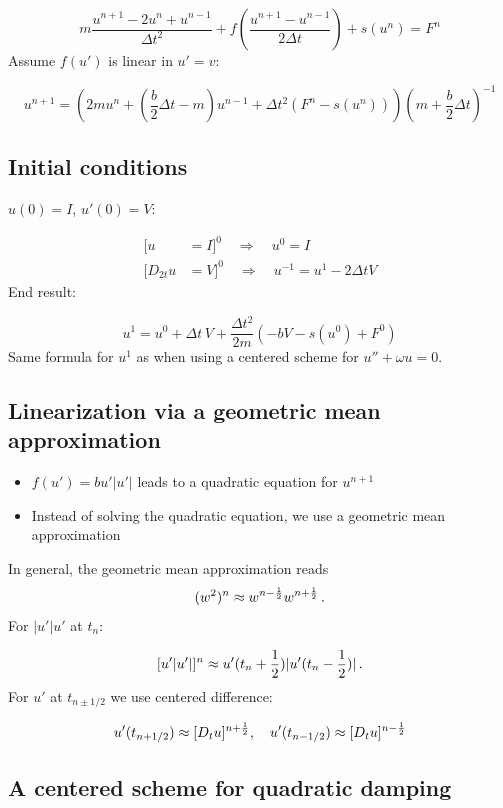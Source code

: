 \documentclass[%
oneside,                 %
final,                   %
10pt]{article}
\begin{document}
\[
m\frac{u^{n+1}-2u^n + u^{n-1}}{\Delta t^2}
+ f(\frac{u^{n+1}-u^{n-1}}{2\Delta t}) + s(u^n) = F^n
\]
Assume $f(u')$ is linear in $u'=v$:

\[
u^{n+1} = \left(2mu^n + (\frac{b}{2}\Delta t - m)u^{n-1} +
\Delta t^2(F^n - s(u^n))
\right)(m + \frac{b}{2}\Delta t)^{-1}
\]

\subsection*{Initial conditions}

$u(0)=I$, $u'(0)=V$:

\begin{align*}
\lbrack u &=I\rbrack^0\quad\Rightarrow\quad u^0=I\\ 
\lbrack D_{2t}u &=V\rbrack^0\quad\Rightarrow\quad u^{-1} = u^{1} - 2\Delta t V
\end{align*}
End result:

\[
u^1 = u^0 + \Delta t\, V
+ \frac{\Delta t^2}{2m}(-bV - s(u^0) + F^0)
\]
Same formula for $u^1$ as when using a centered scheme for $u''+\omega u=0$.

\subsection*{Linearization via a geometric mean approximation}
\label{vib:ode2:fdm:fquad}

\begin{itemize}
 \item $f(u')=bu'|u'|$ leads to a quadratic equation for $u^{n+1}$

 \item Instead of solving the quadratic equation, we use a geometric mean
   approximation
\end{itemize}

\noindent
In general, the geometric mean approximation reads
\[ (w^2)^n \approx w^{n-\half}w^{n+\half}\tp\]
For $|u'|u'$ at $t_n$:

\[ [u'|u'|]^n \approx u'(t_n+{\half})|u'(t_n-{\half})|\tp\]
For $u'$ at $t_{n\pm 1/2}$ we use centered difference:

\[
u'(t_{n+1/2})\approx [D_t u]^{n+\half},\quad u'(t_{n-1/2})\approx [D_t u]^{n-\half}
\]

\subsection*{A centered scheme for quadratic damping}
\end{document}

